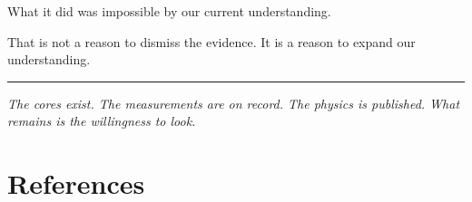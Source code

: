 \documentclass[11pt]{article}
\begin{document}
What it did was impossible by our current understanding.

That is not a reason to dismiss the evidence. It is a reason to expand our understanding.

\vspace{2em}
\hrule
\vspace{1em}

\textit{The cores exist. The measurements are on record. The physics is published. What remains is the willingness to look.}

\section*{References}


\end{document}
